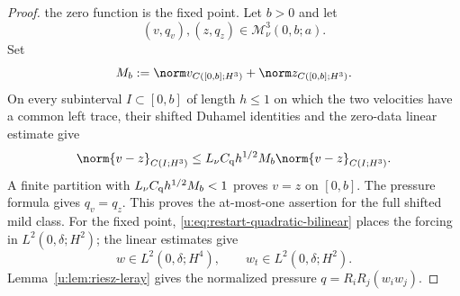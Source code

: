 \begin{proof}
the zero function is the fixed point.  Let \(b>0\) and let
\[
 (v,q_v),(z,q_z)\in\mathscr M_\nu^3(0,b;a).
\]
Set
\[
 M_b:=\norm v_{C([0,b];H^3)}+\norm z_{C([0,b];H^3)}.
\]
On every subinterval \(I\subset[0,b]\) of length \(h\le1\) on which the two
velocities have a common left trace, their shifted Duhamel identities and the
zero-data linear estimate give
\[
 \norm{v-z}_{C(I;H^3)}
 \le L_\nu C_{\rm q}h^{1/2}M_b
 \norm{v-z}_{C(I;H^3)}.
\]
A finite partition with
\(L_\nu C_{\rm q}h^{1/2}M_b<1\) proves \(v=z\) on \([0,b]\).
The pressure formula gives \(q_v=q_z\).  This proves the at-most-one
assertion for the full shifted mild class.  For the fixed point,
\eqref{u:eq:restart-quadratic-bilinear} places the forcing in
\(L^2(0,\delta;H^2)\); the linear estimates give
\[
 w\in L^2(0,\delta;H^4),
 \qquad
 w_t\in L^2(0,\delta;H^2).
\]
Lemma~\ref{u:lem:riesz-leray} gives the normalized pressure
\(q=R_iR_j(w_iw_j)\).


\end{proof}
